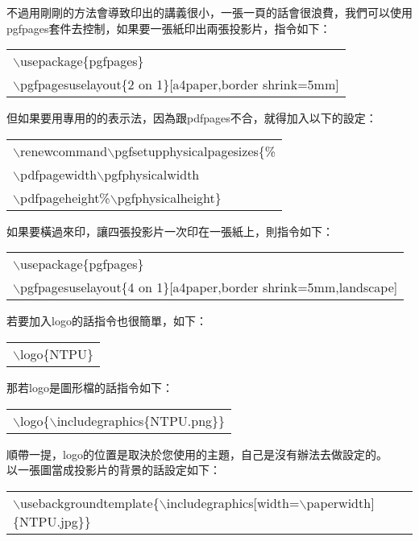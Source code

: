不過用剛剛的方法會導致印出的講義很小，一張一頁的話會很浪費，我們可以使用pgfpages套件去控制，如果要一張紙印出兩張投影片，指令如下：
\begin{center}\colorbox{slight}{\begin{tabular}{p{}}
    $\backslash$usepackage\{pgfpages\}\\
	$\backslash$pgfpagesuselayout\{2 on 1\}[a4paper,border shrink=5mm]\\
\end{tabular}}
\end{center}
但如果要用專用的\XeLaTeX 的表示法，因為跟pdfpages不合，就得加入以下的設定：
\begin{center}\colorbox{slight}{\begin{tabular}{p{}}
    $\backslash$renewcommand$\backslash$pgfsetupphysicalpagesizes\{\%\\
    $\backslash$pdfpagewidth$\backslash$pgfphysicalwidth\\
    $\backslash$pdfpageheight\%$\backslash$pgfphysicalheight\}\\
\end{tabular}}
\end{center}
如果要橫過來印，讓四張投影片一次印在一張紙上，則指令如下：
\begin{center}\colorbox{slight}{\begin{tabular}{p{}}
    $\backslash$usepackage\{pgfpages\}\\
    $\backslash$pgfpagesuselayout\{4 on 1\}[a4paper,border shrink=5mm,landscape]\\
\end{tabular}}
\end{center}
若要加入logo的話指令也很簡單，如下：
\begin{center}\colorbox{slight}{\begin{tabular}{p{}}
    $\backslash$logo\{NTPU\}
\end{tabular}}
\end{center}
那若logo是圖形檔的話指令如下：
\begin{center}\colorbox{slight}{\begin{tabular}{p{}}
    $\backslash$logo\{$\backslash$includegraphics\{NTPU.png\}\}
\end{tabular}}
\end{center}
順帶一提，logo的位置是取決於您使用的主題，自己是沒有辦法去做設定的。\\
以一張圖當成投影片的背景的話設定如下：
\begin{center}\colorbox{slight}{\begin{tabular}{p{}}
    $\backslash$usebackgroundtemplate\{$\backslash$includegraphics[width=$\backslash$paperwidth]\{NTPU.jpg\}\}
\end{tabular}}
\end{center}
